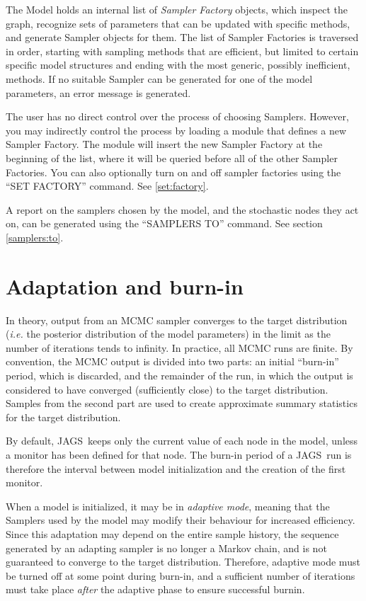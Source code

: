 \documentclass[11pt, a4paper, titlepage]{report}
\newcommand{\JAGS}{\textsf{JAGS}}
\begin{document}
The Model holds an internal list of {\em Sampler Factory} objects,
which inspect the graph, recognize sets of parameters that can be
updated with specific methods, and generate Sampler objects for
them. The list of Sampler Factories is traversed in order, starting with
sampling methods that are efficient, but limited to certain specific
model structures and ending with the most generic, possibly
inefficient, methods. If no suitable Sampler can be generated for one
of the model parameters, an error message is generated.

The user has no direct control over the process of choosing
Samplers. However, you may indirectly control the process by loading a
module that defines a new Sampler Factory. The module will insert the
new Sampler Factory at the beginning of the list, where it will be
queried before all of the other Sampler Factories. You can also 
optionally turn on and off sampler factories using the ``SET FACTORY''
command. See \ref{set:factory}.

A report on the samplers chosen by the model, and the stochastic nodes
they act on, can be generated using the ``SAMPLERS TO'' command. See 
section \ref{samplers:to}.
 
\section{Adaptation and burn-in}

In theory, output from an MCMC sampler converges to the target
distribution ({\em i.e.} the posterior distribution of the model
parameters) in the limit as the number of iterations tends to
infinity. In practice, all MCMC runs are finite.  By convention, the
MCMC output is divided into two parts: an initial ``burn-in'' period,
which is discarded, and the remainder of the run, in which the output
is considered to have converged (sufficiently close) to the target
distribution. Samples from the second part are used to create
approximate summary statistics for the target distribution.

By default, \JAGS\ keeps only the current value of each node in the
model, unless a monitor has been defined for that node. The burn-in
period of a \JAGS\ run is therefore the interval between model
initialization and the creation of the first monitor.

When a model is initialized, it may be in {\em adaptive mode}, meaning
that the Samplers used by the model may modify their behaviour for
increased efficiency. Since this adaptation may depend on the entire
sample history, the sequence generated by an adapting sampler is no
longer a Markov chain, and is not guaranteed to converge to the target
distribution. Therefore, adaptive mode must be turned off at some
point during burn-in, and a sufficient number of iterations must take
place {\em after} the adaptive phase to ensure successful burnin.
\end{document}
